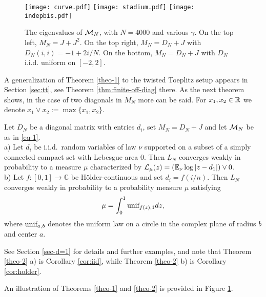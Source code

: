 \documentclass{amsart}
\numberwithin{equation}{section}
\def\corAB{}
\def\corOZ{}
\begin{document}

\begin{figure}[t]
\begin{center}
  \texttt{[image: curve.pdf]}
  \texttt{[image: stadium.pdf]}
  \texttt{[image: indepbis.pdf]}
\caption{
 The eigenvalues of $\mathcal{M}_N$, with $N=4000$ and various $\gamma$. On the top
 left,
 $M_N=J+J^2$. On the top right, $M_N=D_N+J$ with $D_N(i,i)=-1+2i/N$. On the
 bottom, $M_N=D_N+J$ with
 $D_N$ i.i.d.  uniform on $[-2,2]$.
}
\label{fig:1}
\end{center}
\end{figure}
\noindent
A generalization of Theorem \ref{theo-1} to the twisted Toeplitz setup
appears in Section \ref{sec:tt}, see Theorem \ref{thm:finite-off-diag} there. As the next theorem shows,
in the case of two diagonals in $M_N$ more can be said.
\corOZ{For $x_1, x_2 \in \mathbb{R}$ we denote $x_1 \vee x_2:=\max\{x_1,x_2\}$.}
\begin{theorem}\label{theo-2} Let $D_N$ be a diagonal matrix with
  entries $d_i$, set $M_N=D_N+J$ and let $\mathcal{M}_N$ be as in \eqref{eq-1}.\\
  a) Let $d_i$ be i.i.d.~random variables of law $\nu$ supported on a subset of a simply connected compact set with Lebesgue area $0.$
  Then $L_N$ converges weakly in probability to a measure $\mu$ characterized
  by $\mathcal{L}_\mu(z)=(\mathbb E_\nu \log |z-d_1|)\vee 0$.\\
  b) Let $f:[0,1]\to \mathbb{C}$ be H\"{o}lder-continuous
  and set $d_i=f(i/n)$. Then
  $L_N$ converges weakly in probability to a probability measure $\mu$ satisfying
  $$ \mu = \int_0^1 \mbox{\rm unif}_{f(z),1} dz,$$
  where $\mbox{\rm unif}_{a,b}$ denotes the uniform law on a circle \corAB{in the complex plane} of radius $b$ and center $a$.
\end{theorem}
\noindent
See Section \ref{sec-d=1} for details and further examples, and note
that Theorem \ref{theo-2} a) is Corollary \ref{cor:iid}, while
Theorem \ref{theo-2} b) is Corollary \ref{cor:holder}.



An illustration of Theorems \ref{theo-1} and
\ref{theo-2} is provided in Figure \ref{fig:1}.
\end{document}
